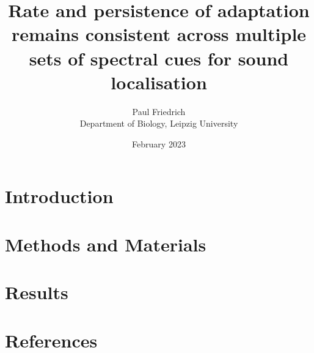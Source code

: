 \documentclass[10pt, twocolumn]{article}
\newcommand\thesistitle{Rate and persistence of adaptation remains consistent across multiple sets of spectral cues for sound localisation}%
\begin{document}
\title{\thesistitle}%
\author{Paul Friedrich\\Department of Biology, Leipzig University}
\date{February 2023}
\maketitle

\newpage%
\section{Introduction}\label{sec1}


\newpage
\section{Methods and Materials}\label{sec2}%


\newpage
\section{Results}\label{sec3}%


%
\newpage\section{References}
\nocite{*}

%
\end{document}
